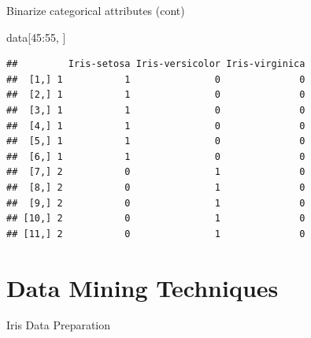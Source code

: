 \documentclass[ignorenonframetext,]{beamer}
\newenvironment{Shaded}{\begin{snugshade}}{\end{snugshade}}
\newcommand{\KeywordTok}[1]{\textcolor[rgb]{0.13,0.29,0.53}{\textbf{{#1}}}}
\newcommand{\DataTypeTok}[1]{\textcolor[rgb]{0.13,0.29,0.53}{{#1}}}
\newcommand{\DecValTok}[1]{\textcolor[rgb]{0.00,0.00,0.81}{{#1}}}
\newcommand{\FloatTok}[1]{\textcolor[rgb]{0.00,0.00,0.81}{{#1}}}
\newcommand{\StringTok}[1]{\textcolor[rgb]{0.31,0.60,0.02}{{#1}}}
\newcommand{\CommentTok}[1]{\textcolor[rgb]{0.56,0.35,0.01}{\textit{{#1}}}}
\newcommand{\OtherTok}[1]{\textcolor[rgb]{0.56,0.35,0.01}{{#1}}}
\newcommand{\NormalTok}[1]{{#1}}
\begin{document}
\begin{frame}[fragile]{Binarize categorical attributes (cont)}

\begin{Shaded}
\begin{Highlighting}[]
\NormalTok{data[}\DecValTok{45}\NormalTok{:}\DecValTok{55}\NormalTok{, ]}
\end{Highlighting}
\end{Shaded}

\begin{verbatim}
##         Iris-setosa Iris-versicolor Iris-virginica
##  [1,] 1           1               0              0
##  [2,] 1           1               0              0
##  [3,] 1           1               0              0
##  [4,] 1           1               0              0
##  [5,] 1           1               0              0
##  [6,] 1           1               0              0
##  [7,] 2           0               1              0
##  [8,] 2           0               1              0
##  [9,] 2           0               1              0
## [10,] 2           0               1              0
## [11,] 2           0               1              0
\end{verbatim}

\end{frame}

\section{Data Mining Techniques}\label{data-mining-techniques}

\begin{frame}[fragile]{Iris Data Preparation}

\begin{Shaded}
\end{Shaded}

\end{frame}
\end{document}
